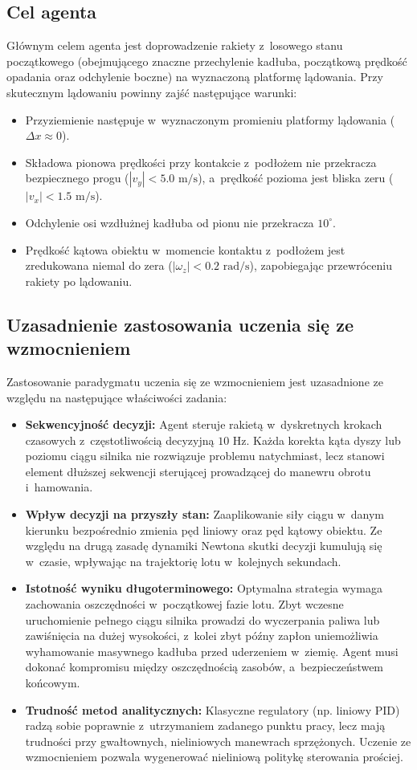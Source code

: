 \documentclass[12pt]{article}
\begin{document}
\subsection{Cel agenta}
Głównym celem agenta jest doprowadzenie rakiety z~losowego stanu początkowego (obejmującego znaczne przechylenie kadłuba, początkową prędkość opadania oraz odchylenie boczne) na wyznaczoną platformę lądowania. Przy skutecznym lądowaniu powinny zajść następujące warunki:
\begin{itemize}
    \item Przyziemienie następuje w~wyznaczonym promieniu platformy lądowania ($\Delta x \approx 0$).
    \item Składowa pionowa prędkości przy kontakcie z~podłożem nie przekracza bezpiecznego progu ($|v_y| < 5.0\text{ m/s}$), a~prędkość pozioma jest bliska zeru ($|v_x| < 1.5\text{ m/s}$).
    \item Odchylenie osi wzdłużnej kadłuba od pionu nie przekracza $10^\circ$.
    \item Prędkość kątowa obiektu w~momencie kontaktu z~podłożem jest zredukowana niemal do zera ($|\omega_z| < 0.2\text{ rad/s}$), zapobiegając przewróceniu rakiety po lądowaniu.
\end{itemize}

\subsection{Uzasadnienie zastosowania uczenia się ze wzmocnieniem}

Zastosowanie paradygmatu uczenia się ze wzmocnieniem jest uzasadnione ze względu na następujące właściwości zadania:
\begin{itemize}
    \item \textbf{Sekwencyjność decyzji:} Agent steruje rakietą w~dyskretnych krokach czasowych z~częstotliwością decyzyjną $10\text{ Hz}$. Każda korekta kąta dyszy lub poziomu ciągu silnika nie rozwiązuje problemu natychmiast, lecz stanowi element dłuższej sekwencji sterującej prowadzącej do manewru obrotu i~hamowania.
    \item \textbf{Wpływ decyzji na przyszły stan:} Zaaplikowanie siły ciągu w~danym kierunku bezpośrednio zmienia pęd liniowy oraz pęd kątowy obiektu. Ze względu na drugą zasadę dynamiki Newtona skutki decyzji kumulują się w~czasie, wpływając na trajektorię lotu w~kolejnych sekundach.
    \item \textbf{Istotność wyniku długoterminowego:} Optymalna strategia wymaga zachowania oszczędności w~początkowej fazie lotu. Zbyt wczesne uruchomienie pełnego ciągu silnika prowadzi do wyczerpania paliwa lub zawiśnięcia na dużej wysokości, z~kolei zbyt późny zapłon uniemożliwia wyhamowanie masywnego kadłuba przed uderzeniem w~ziemię. Agent musi dokonać kompromisu między oszczędnością zasobów, a~bezpieczeństwem końcowym.
    \item \textbf{Trudność metod analitycznych:} Klasyczne regulatory (np. liniowy PID) radzą sobie poprawnie z~utrzymaniem zadanego punktu pracy, lecz mają trudności przy gwałtownych, nieliniowych manewrach sprzężonych. Uczenie ze wzmocnieniem pozwala wygenerować nieliniową politykę sterowania prościej.
\end{itemize}
\end{document}
